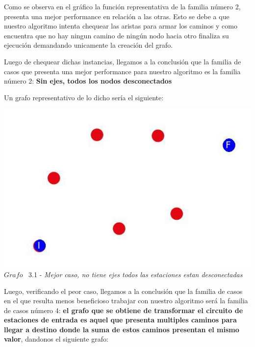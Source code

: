 Como se observa en el gr\'afico la funci\'on representativa de la familia n\'umero 2, presenta una mejor performance en relaci\'on a las otras. Esto se debe a que nuestro algoritmo intenta chequear las aristas para armar los caminos y como encuentra que no hay ningun camino de ningún nodo hacia otro finaliza su ejecuci\'on demandando unicamente la creaci\'on del grafo.

Luego de chequear dichas instancias, llegamos a la conclusi\'on que la familia de casos que presenta una mejor performance para nuestro algoritmo
es la familia número 2: \textbf{Sin ejes, todos los nodos desconectados}

Un grafo representativo de lo dicho ser\'ia el siguiente:

\vspace*{0.3cm} \vspace*{0.3cm}
  \begin{center}
\includegraphics[scale=0.5]{./EJ3/grafoSinEjes.jpeg}
\\{$Grafo$ \ 3.1 - \textit{Mejor caso, no tiene ejes todos las estaciones estan desconectadas}} 
  \end{center}
  \vspace*{0.3cm}
  
Luego, verificando el peor caso, llegamos a la conclusi\'on que la familia de casos en el que resulta menos beneficioso trabajar con nuestro algoritmo ser\'a la familia de casos número 4: \textbf{el grafo que se obtiene de transformar el circuito de estaciones de entrada es aquel que presenta multiples caminos para llegar a destino donde la suma de estos caminos presentan el mismo valor}, dandonos el siguiente grafo:\\

